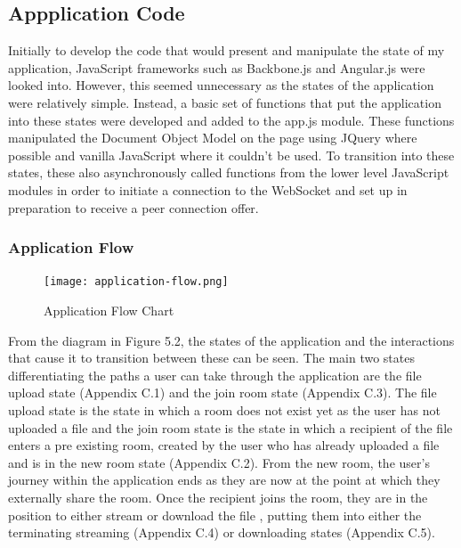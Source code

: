\documentclass[]{report}
\begin{document}
			\subsection{Appplication Code}
			Initially to develop the code that would present and manipulate the state of my application, JavaScript frameworks such as Backbone.js and Angular.js were looked into. However, this seemed unnecessary as the states of the application were relatively simple. Instead, a basic set of functions that put the application into these states were developed and added to the app.js module. These functions manipulated the Document Object Model on the page using JQuery where possible and vanilla JavaScript where it couldn't be used. To transition into these states, these also asynchronously called functions from the lower level JavaScript modules in order to initiate a connection to the WebSocket and set up in preparation to receive a peer connection offer.
			
			\subsubsection{Application Flow}
			\begin{figure}[H]
				\caption{Application Flow Chart}
				\centering
				\texttt{[image: application-flow.png]}
			\end{figure}
						
			From the diagram in Figure 5.2, the states of the application and the interactions that cause it to transition between these can be seen. The main two states differentiating the paths a user can take through the application are the file upload state (Appendix C.1) and the join room state (Appendix C.3). The file upload state is the state in which a room does not exist yet as the user has not uploaded a file and the join room state is the state in which a recipient of the file enters a pre existing room, created by the user who has already uploaded a file and is in the new room state (Appendix C.2). From the new room, the user's journey within the application ends as they are now at the point at which they externally share the room. Once the recipient joins the room, they are in the position to either stream or download the file , putting them into either the terminating streaming (Appendix C.4) or downloading states (Appendix C.5).
		
\end{document}
